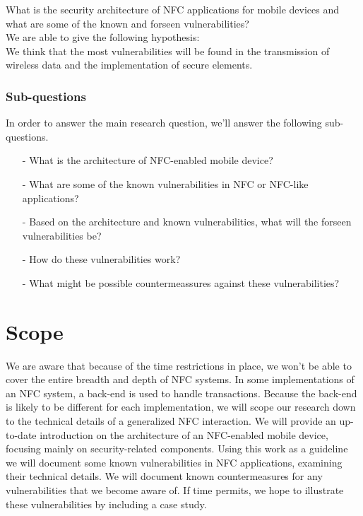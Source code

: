 \documentclass[11pt]{article} %
\begin{document}
\noindent What is the security architecture of NFC applications for mobile devices and what are some of the known and forseen vulnerabilities? %
\\

\noindent We are able to give the following hypothesis:
\\

\noindent We think that the most vulnerabilities will be found in the transmission of wireless data and the implementation of secure elements. %

\subsubsection{Sub-questions}

In order to answer the main research question, we'll answer the following sub-questions.

\begin{itemize}
\item [-] What is the architecture of NFC-enabled mobile device?

\item [-] What are some of the known vulnerabilities in NFC or NFC-like applications?

\item [-] Based on the architecture and known vulnerabilities, what will the forseen vulnerabilities be?

\item [-] How do these vulnerabilities work?

\item [-] What might be possible countermeassures against these vulnerabilities?

\end{itemize}

\section{Scope}
We are aware that because of the time restrictions in place, we won't be able to cover the entire breadth and depth of NFC systems.
In some implementations of an NFC system, a back-end is used to handle transactions.
Because the back-end is likely to be different for each implementation, we will scope our research down to the technical details of a generalized NFC interaction.
We will provide an up-to-date introduction on the architecture of an NFC-enabled mobile device, focusing mainly on security-related components.
Using this work as a guideline we will document some known vulnerabilities in NFC applications, examining their technical details.
We will document known countermeasures for any vulnerabilities that we become aware of.
If time permits, we hope to illustrate these vulnerabilities by including a case study.
\end{document}
